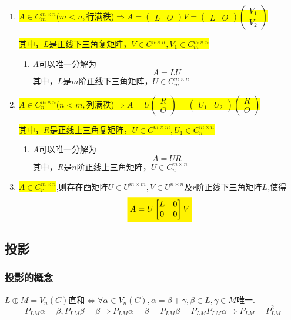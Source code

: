 \begin{enumerate}
\item\colorbox{yellow}{$A\in C^{m\times n}_m$($m<n,\mbox{行满秩}$)$\Rightarrow A=\begin{pmatrix}
	L&O\end{pmatrix}V=\begin{pmatrix}L&O\end{pmatrix}\begin{pmatrix}V_1\\V_2\end{pmatrix}$}

\colorbox{yellow}{其中，$L$是正线下三角复矩阵，$V\in C^{n\times n},V_1\in C^{m\times n}_m$}
 \begin{enumerate}
 \item	 $A$可以唯一分解为
 	\[
 		A=LU
 	\]
 	其中，$L$是$m$阶正线下三角矩阵，$U\in C^{m\times n}_m$
\end{enumerate}
\item\colorbox{yellow}{$A\in C^{m\times n}_n$($n<m,\mbox{列满秩}$)$\Rightarrow A=U\begin{pmatrix}
		R\\O\end{pmatrix}=\begin{pmatrix}U_1&U_2\end{pmatrix}\begin{pmatrix}
		R\\O\end{pmatrix}$}
	
	\colorbox{yellow}{其中，$R$是正线上三角复矩阵，$U\in C^{m\times m},U_1\in C^{m\times n}_n$}
	 \begin{enumerate}
		\item	 $A$可以唯一分解为
		\[
		A=UR
		\]
		其中，$R$是$n$阶正线上三角矩阵，$U\in C^{m\times n}_n$
	\end{enumerate}
\item \colorbox{yellow}{$A\in C^{m\times n}_r$},则存在酉矩阵$U\in U^{m\times m},V\in U^{n\times n}$及$r$阶正线下三角矩阵$L$,使得
\[\colorbox{yellow}{$
A=U\begin{bmatrix}
		L&0\\
		0&0
\end{bmatrix}V$}
\]

\end{enumerate}

\subsection{投影}
\subsubsection{投影的概念}
$L\oplus M=V_n(C)$直和$\Leftrightarrow \forall \alpha \in V_n(C),\alpha=\beta+\gamma,\beta \in L,\gamma \in M$唯一.
\[
P_{LM}\alpha=\beta,P_{LM}\beta =\beta \Rightarrow P_{LM}\alpha=\beta=P_{LM}\beta=P_{LM}P_{LM}\alpha\Rightarrow P_{LM}=P_{LM}^2
\]

